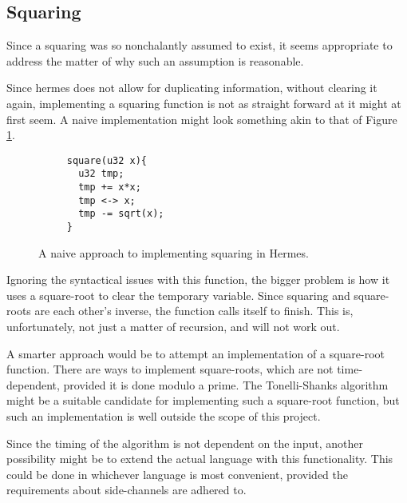 


\subsection{Squaring}
\label{squaring}
Since a squaring was so nonchalantly assumed to exist, it seems appropriate to address the matter of why such an assumption is reasonable.

Since hermes does not allow for duplicating information, without clearing it again, implementing a squaring function is not as straight forward at it might at first seem. A naive implementation might look something akin to that of Figure \ref{HermesSquare}.
\begin{figure}
\begin{verbatim}
     square(u32 x){
       u32 tmp;
       tmp += x*x;
       tmp <-> x;
       tmp -= sqrt(x);
     }
\end{verbatim}
  \caption{A naive approach to implementing squaring in Hermes.}
  \label{HermesSquare}
\end{figure}

Ignoring the syntactical issues with this function, the bigger problem is how it uses a square-root to clear the temporary variable. Since squaring and square-roots are each other's inverse, the function calls itself to finish. This is, unfortunately, not just a matter of recursion, and will not work out.

A smarter approach would be to attempt an implementation of a square-root function. There are ways to implement square-roots, which are not time-dependent, provided it is done modulo a prime. The Tonelli-Shanks algorithm\cite{TonelliShanks} might be a suitable candidate for implementing such a square-root function, but such an implementation is well outside the scope of this project.

Since the timing of the algorithm is not dependent on the input, another possibility might be to extend the actual language with this functionality. This could be done in whichever language is most convenient, provided the requirements about side-channels are adhered to.





